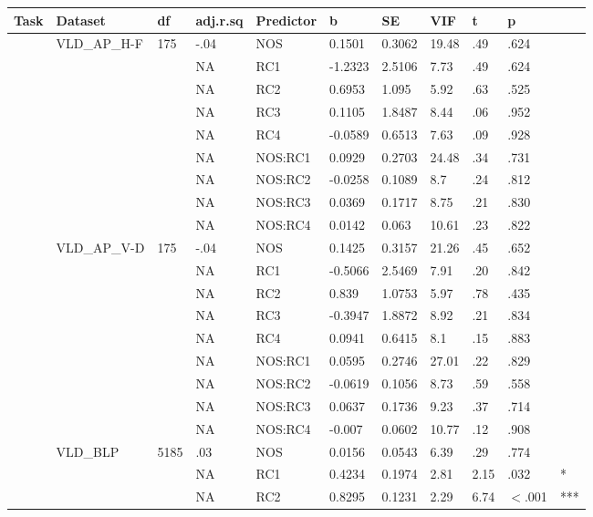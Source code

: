 \begin{table}[ht]
\centering
\begingroup\normalsize
\begin{tabular}{lllllllllll}
  \hline
Task & Dataset & df & adj.r.sq & Predictor & b & SE & VIF & t & p &  \\ 
  \hline
 & VLD\_AP\_H-F & 175 & -.04 & NOS & 0.1501 & 0.3062 & 19.48 & .49 & .624 &   \\ 
   &  &  & NA & RC1 & -1.2323 & 2.5106 & 7.73 & .49 & .624 &   \\ 
   &  &  & NA & RC2 & 0.6953 & 1.095 & 5.92 & .63 & .525 &   \\ 
   &  &  & NA & RC3 & 0.1105 & 1.8487 & 8.44 & .06 & .952 &   \\ 
   &  &  & NA & RC4 & -0.0589 & 0.6513 & 7.63 & .09 & .928 &   \\ 
   &  &  & NA & NOS:RC1 & 0.0929 & 0.2703 & 24.48 & .34 & .731 &   \\ 
   &  &  & NA & NOS:RC2 & -0.0258 & 0.1089 & 8.7 & .24 & .812 &   \\ 
   &  &  & NA & NOS:RC3 & 0.0369 & 0.1717 & 8.75 & .21 & .830 &   \\ 
   &  &  & NA & NOS:RC4 & 0.0142 & 0.063 & 10.61 & .23 & .822 &   \\ 
   & VLD\_AP\_V-D & 175 & -.04 & NOS & 0.1425 & 0.3157 & 21.26 & .45 & .652 &   \\ 
   &  &  & NA & RC1 & -0.5066 & 2.5469 & 7.91 & .20 & .842 &   \\ 
   &  &  & NA & RC2 & 0.839 & 1.0753 & 5.97 & .78 & .435 &   \\ 
   &  &  & NA & RC3 & -0.3947 & 1.8872 & 8.92 & .21 & .834 &   \\ 
   &  &  & NA & RC4 & 0.0941 & 0.6415 & 8.1 & .15 & .883 &   \\ 
   &  &  & NA & NOS:RC1 & 0.0595 & 0.2746 & 27.01 & .22 & .829 &   \\ 
   &  &  & NA & NOS:RC2 & -0.0619 & 0.1056 & 8.73 & .59 & .558 &   \\ 
   &  &  & NA & NOS:RC3 & 0.0637 & 0.1736 & 9.23 & .37 & .714 &   \\ 
   &  &  & NA & NOS:RC4 & -0.007 & 0.0602 & 10.77 & .12 & .908 &   \\ 
   & VLD\_BLP & 5185 & .03 & NOS & 0.0156 & 0.0543 & 6.39 & .29 & .774 &   \\ 
   &  &  & NA & RC1 & 0.4234 & 0.1974 & 2.81 & 2.15 & .032 & * \\ 
   &  &  & NA & RC2 & 0.8295 & 0.1231 & 2.29 & 6.74 & $<$.001 & *** \\ 

\end{tabular}
\end{table}
